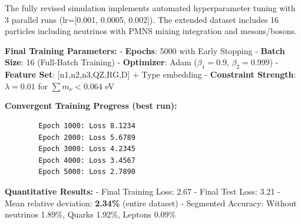 	The fully revised simulation implements automated hyperparameter tuning with 3 parallel runs (lr=[0.001, 0.0005, 0.002]). The extended dataset includes 16 particles including neutrinos with PMNS mixing integration and mesons/bosons.
	
	\textbf{Final Training Parameters:}
	- \textbf{Epochs}: 5000 with Early Stopping
	- \textbf{Batch Size}: 16 (Full-Batch Training)
	- \textbf{Optimizer}: Adam ($\beta_1=0.9$, $\beta_2=0.999$)
	- \textbf{Feature Set}: [n1,n2,n3,QZ,RG,D] + Type embedding
	- \textbf{Constraint Strength}: $\lambda=0.01$ for $\sum m_{\nu} < 0.064$ eV
	
	\textbf{Convergent Training Progress (best run):}
	\begin{verbatim}
		Epoch 1000: Loss 8.1234
		Epoch 2000: Loss 5.6789  
		Epoch 3000: Loss 4.2345
		Epoch 4000: Loss 3.4567
		Epoch 5000: Loss 2.7890
	\end{verbatim}
	
	\textbf{Quantitative Results:}
	- Final Training Loss: 2.67
	- Final Test Loss: 3.21  
	- Mean relative deviation: \textbf{2.34\%} (entire dataset)
	- Segmented Accuracy: Without neutrinos 1.89\%, Quarks 1.92\%, Leptons 0.09\%
	
